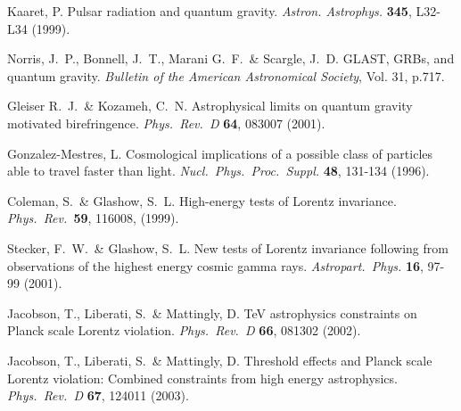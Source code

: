 \documentclass[12pt]{article}
\begin{document}
\begin{thebibliography}{99}
Kaaret, P. Pulsar radiation and quantum gravity. {\em Astron.
Astrophys.} {\bf 345}, L32-L34 (1999).

Norris, J.~P., Bonnell, J.~T., Marani G.~F.~\& Scargle, J.~D.
GLAST, GRBs, and quantum gravity. {\em Bulletin of the American
Astronomical Society}, Vol. 31, p.717.

Gleiser R.~J.~\& Kozameh, C.~N. Astrophysical limits on quantum
gravity motivated birefringence. {\em Phys.\ Rev.\ D }{\bf 64}, 083007
(2001).

Gonzalez-Mestres, L. Cosmological implications of a possible class
of particles able to travel faster than light. {\em Nucl.\ Phys.\
Proc.\ Suppl.}  {\bf 48}, 131-134 (1996).

\bibitem{CG}
Coleman, S.~\& Glashow, S.~L. High-energy tests of Lorentz
invariance. {\em Phys.~Rev.~}{\bf 59}, 116008, (1999).

Stecker, F.~W.~\& Glashow, S.~L. New tests of Lorentz invariance
following from observations of the  highest energy cosmic gamma
rays. {\em Astropart.\ Phys.} {\bf 16}, 97-99 (2001).

Jacobson, T., Liberati, S.~\&  Mattingly, D. TeV astrophysics
constraints on Planck scale Lorentz violation. {\em Phys.\ Rev.\ D} {\bf
66}, 081302 (2002).

Jacobson, T., Liberati, S.~\& Mattingly, D. Threshold effects and
Planck scale Lorentz violation: Combined  constraints from high
energy astrophysics.
{\em Phys.\ Rev.\ D} {\bf 67}, 124011 (2003).


\end{thebibliography}
\end{document}
